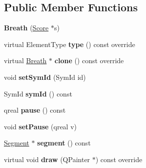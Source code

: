 \subsection*{Public Member Functions}
\begin{DoxyCompactItemize}
\item 
\mbox{\label{class_ms_1_1_breath_ad57804c604ea6ec327d60eee57f8e1a7}} 
{\bfseries Breath} (\hyperlink{class_ms_1_1_score}{Score} $\ast$s)
\item 
\mbox{\label{class_ms_1_1_breath_a259473554e2b548bd05678079739389e}} 
virtual Element\+Type {\bfseries type} () const override
\item 
\mbox{\label{class_ms_1_1_breath_a9f2cd504b2fc7b55079e6aeb4ce485b4}} 
virtual \hyperlink{class_ms_1_1_breath}{Breath} $\ast$ {\bfseries clone} () const override
\item 
\mbox{\label{class_ms_1_1_breath_a15a0c9da5eb54eaa6f1d7125a17b2c36}} 
void {\bfseries set\+Sym\+Id} (Sym\+Id id)
\item 
\mbox{\label{class_ms_1_1_breath_ae6f0fd3901cfe413240d39874b10f911}} 
Sym\+Id {\bfseries sym\+Id} () const
\item 
\mbox{\label{class_ms_1_1_breath_a0203c97956c06f932abb6bfec6766ffa}} 
qreal {\bfseries pause} () const
\item 
\mbox{\label{class_ms_1_1_breath_a340a6edc2097ee4a8b755e60961241eb}} 
void {\bfseries set\+Pause} (qreal v)
\item 
\mbox{\label{class_ms_1_1_breath_abbc6d59680c3ad25468894b14ca4c235}} 
\hyperlink{class_ms_1_1_segment}{Segment} $\ast$ {\bfseries segment} () const
\item 
\mbox{\label{class_ms_1_1_breath_a6b168d11db742b8ce3dc383f2c71e9aa}} 
virtual void {\bfseries draw} (Q\+Painter $\ast$) const override
\item 
\mbox{\label{class_ms_1_1_breath_a4ca9a954f34dc5b9e2f9f018485dd992}} 

\end{DoxyCompactItemize}
